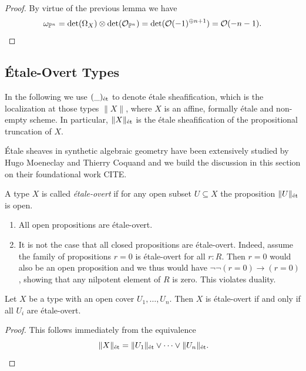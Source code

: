 \begin{proof}
  By virtue of the previous lemma we have
  \[
    \omega_{\bP^n} = \det(\Omega_X) \otimes \det(\mathcal O_{\bP^n}) = \det(\mathcal O(-1)^{\oplus n+1}) = \mathcal O (-n-1).
  \]
\end{proof}





\subsection{Étale-Overt Types}

In the following we use \((\_)_{\et}\) to denote étale sheafification, which is the localization at those types $\|X\|$, where $X$ is an affine, formally étale and non-empty scheme.
In particular, $\|X\|_\et$ is the étale sheafification of the propositional truncation of $X$.

Étale sheaves in synthetic algebraic geometry have been extensively studied by Hugo Moeneclay and Thierry Coquand and we build the discussion in this section on their foundational work {\color{red}CITE}.

\begin{definition}
  A type \(X\) is called \emph{étale-overt} if for any open subset \(U\subseteq X\)
  the proposition \(\|U\|_\et\) is open.
\end{definition}

\begin{example}
  \begin{enumerate}
    \item[i)] All open propositions are étale-overt.
    \item[ii)] It is not the case that all closed propositions are étale-overt.
      Indeed, assume the family of propositions $r=0$ is étale-overt for all $r:R$.
      Then $r=0$ would also be an open proposition and we thus would have $\neg\neg(r=0) \to (r=0)$, showing that any nilpotent element of $R$ is zero. This violates duality.
  \end{enumerate}
\end{example}

\begin{lemma}
  \label{etale-overtness-is-local}
  Let $X$ be a type with an open cover $U_1,\dots,U_n$.
  Then $X$ is étale-overt if and only if all $U_i$ are étale-overt.
\end{lemma}

\begin{proof}
  This follows immediately from the equivalence
  \[
    \|X\|_\et = \|U_1\|_\et \lor \dots \lor \|U_n\|_\et\rlap{.}
  \]
\end{proof}

